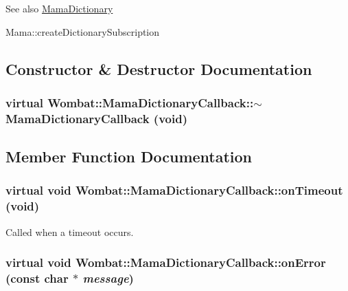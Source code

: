 \begin{DoxySeeAlso}{See also}
\hyperlink{classWombat_1_1MamaDictionary}{MamaDictionary} 

Mama::createDictionarySubscription 
\end{DoxySeeAlso}


\subsection{Constructor \& Destructor Documentation}
\hypertarget{classWombat_1_1MamaDictionaryCallback_a5395bc3242fe2651bcfaefcf60b7375f}{
\subsubsection[{$\sim$MamaDictionaryCallback}]{\setlength{\rightskip}{0pt plus 5cm}virtual Wombat::MamaDictionaryCallback::$\sim$MamaDictionaryCallback (void)}}
\label{classWombat_1_1MamaDictionaryCallback_a5395bc3242fe2651bcfaefcf60b7375f}


\subsection{Member Function Documentation}
\hypertarget{classWombat_1_1MamaDictionaryCallback_a61cce11968f309a252e76c93c5125ecd}{
\subsubsection[{onTimeout}]{\setlength{\rightskip}{0pt plus 5cm}virtual void Wombat::MamaDictionaryCallback::onTimeout (void)}}
\label{classWombat_1_1MamaDictionaryCallback_a61cce11968f309a252e76c93c5125ecd}


Called when a timeout occurs. \hypertarget{classWombat_1_1MamaDictionaryCallback_aad56e9347966d44cb361d0881507a0b2}{
\subsubsection[{onError}]{\setlength{\rightskip}{0pt plus 5cm}virtual void Wombat::MamaDictionaryCallback::onError (const char $\ast$ {\em message})}}
\label{classWombat_1_1MamaDictionaryCallback_aad56e9347966d44cb361d0881507a0b2}



